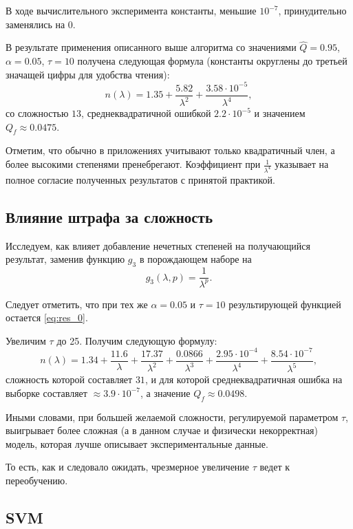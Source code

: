 \documentclass[12pt,a4paper]{article}
\begin{document}
В ходе вычислительного эксперимента константы, меньшие $10^{-7}$, принудительно
заменялись на $0$.

В результате применения описанного выше алгоритма со значениями
$\hat{Q} = 0.95$, $\alpha = 0.05$, $\tau = 10$ получена следующая формула
(константы округлены до третьей значащей цифры для удобства чтения):
\begin{equation}
  n(\lambda) = 1.35 + \frac{5.82}{\lambda^2} + \frac{3.58 \cdot 10^{-5}}{\lambda^4},
  \label{eq:res_0}
\end{equation}
со сложностью $13$, среднеквадратичной ошибкой $2.2 \cdot 10^{-5}$ и значением $Q_f \approx 0.0475$.

Отметим, что обычно в приложениях учитывают только квадратичный член, а более
высокими степенями пренебрегают. Коэффициент при $\frac{1}{\lambda^4}$ указывает
на полное согласие полученных результатов с принятой практикой.

\subsection{Влияние штрафа за сложность}

Исследуем, как влияет добавление нечетных степеней на получающийся результат,
заменив функцию $g_3$ в порождающем наборе на
\[
  g_3(\lambda, p) = \frac{1}{\lambda^p}.
\]

Следует отметить, что при тех же $\alpha = 0.05$ и $\tau = 10$ результирующей функцией остается
\eqref{eq:res_0}.

Увеличим $\tau$ до 25. Получим следующую формулу:
\begin{equation}
  n(\lambda) = 1.34 + \frac{11.6}{\lambda} + \frac{17.37}{\lambda^2} + \frac{0.0866}{\lambda^3} + \frac{2.95 \cdot 10^{-4}}{\lambda^4} + \frac{8.54 \cdot 10^{-7}}{\lambda^5},
  \label{eq:res_incorrect}
\end{equation}
сложность которой составляет $31$, и для которой среднеквадратичная ошибка
на выборке составляет $\approx 3.9 \cdot 10^{-7}$,
а значение $Q_f \approx 0.0498$.

Иными словами, при большей желаемой сложности,
регулируемой параметром $\tau$, выигрывает более сложная (а в данном случае и
физически некорректная) модель, которая лучше описывает экспериментальные данные.

То есть, как и следовало ожидать, чрезмерное увеличение $\tau$ ведет к переобучению.

\subsection{SVM}
\end{document}
